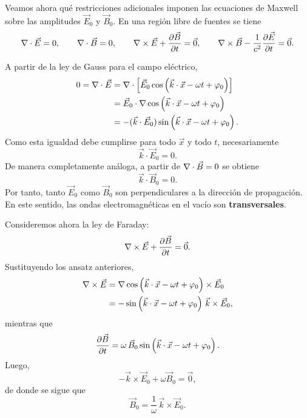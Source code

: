\documentclass[../main.tex]{subfiles}
\begin{document}
Veamos ahora qué restricciones adicionales imponen las ecuaciones de Maxwell sobre las amplitudes $\vec E_0$ y $\vec B_0$. En una región libre de fuentes se tiene
\begin{equation*}
    \nabla\cdot \vec{E}=0,
    \qquad
    \nabla\cdot \vec{B}=0,
    \qquad
    \nabla\times \vec{E}+\frac{\partial \vec{B}}{\partial t}=\vec 0,
    \qquad
    \nabla\times \vec{B}-\frac{1}{c^2}\frac{\partial \vec{E}}{\partial t}=\vec 0.
\end{equation*}

A partir de la ley de Gauss para el campo eléctrico,
\begin{align*}
    0
    =\nabla\cdot \vec{E}
    &=\nabla\cdot\left[\vec E_0\cos\left(\vec k\cdot\vec x-\omega t+\varphi_0\right)\right] \\
    &=\vec E_0\cdot\nabla\cos\left(\vec k\cdot\vec x-\omega t+\varphi_0\right) \\
    &=-(\vec k\cdot\vec E_0)\sin\left(\vec k\cdot\vec x-\omega t+\varphi_0\right).
\end{align*}
Como esta igualdad debe cumplirse para todo $\vec x$ y todo $t$, necesariamente
\begin{equation*}
    \vec k\cdot \vec E_0=0.
\end{equation*}
De manera completamente análoga, a partir de $\nabla\cdot \vec{B}=0$ se obtiene
\begin{equation*}
    \vec k\cdot \vec B_0=0.
\end{equation*}
Por tanto, tanto $\vec E_0$ como $\vec B_0$ son perpendiculares a la dirección de propagación. En este sentido, las ondas electromagnéticas en el vacío son \textbf{transversales}.

Consideremos ahora la ley de Faraday:
\begin{equation*}
    \nabla\times \vec{E}+\frac{\partial \vec{B}}{\partial t}=\vec 0.
\end{equation*}
Sustituyendo los ansatz anteriores,
\begin{align*}
    \nabla\times \vec{E}
    &= \nabla\cos\left(\vec k\cdot\vec x-\omega t+\varphi_0\right)\times \vec E_0 \\
    &= -\sin\left(\vec k\cdot\vec x-\omega t+\varphi_0\right)\,\vec k\times \vec E_0,
\end{align*}
mientras que
\begin{equation*}
    \frac{\partial \vec{B}}{\partial t}
    = \omega\,\vec B_0\sin\left(\vec k\cdot\vec x-\omega t+\varphi_0\right).
\end{equation*}
Luego,
\begin{equation*}
    -\vec k\times \vec E_0+\omega \vec B_0=\vec 0,
\end{equation*}
de donde se sigue que
\begin{equation*}
    \vec B_0=\frac{1}{\omega}\,\vec k\times \vec E_0.
\end{equation*}
\end{document}
